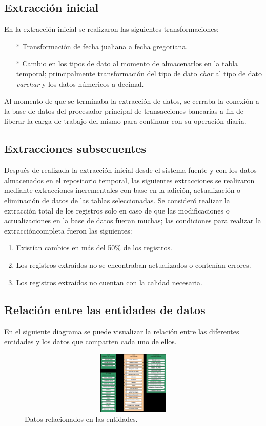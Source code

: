 \documentclass[a4paper,openright,12pt]{book}
\begin{document}
\subsection{Extracción inicial}
En la extracción inicial se realizaron las siguientes transformaciones:
\begin{itemize}
\item[*] Transformación de fecha jualiana a fecha gregoriana.
\item[*] Cambio en los tipos de dato al momento de almacenarlos en la tabla temporal; principalmente transformación del tipo de dato \textit{char} al tipo de dato \textit{varchar} y los datos númericos a decimal.
\end{itemize}
Al momento de que se terminaba la extracción de datos, se cerraba la conexión a la base de datos del procesador principal de transacciones bancarias a fin de liberar la carga de trabajo del mismo para continuar con su operación diaria. 
\subsection{Extracciones subsecuentes}
Después de realizada la extracción inicial desde el sistema fuente y con los datos almacenados en el repositorio temporal, las siguientes extracciones se realizaron mediante extracciones incrementales con base en la adición, actualización o eliminación de datos de las tablas seleccionadas. Se consideró realizar la extracción total de los registros solo en caso de que las modificaciones o actualizaciones en la base de datos fueran muchas; las condiciones para realizar la extraccióncompleta fueron las siguientes:
\begin{enumerate}
\item Existían cambios en más del 50\% de los registros.
\item Los registros extraídos no se encontraban actualizados o contenían errores.
\item Los registros extraídos no cuentan con la calidad necesaria.
\end{enumerate}
\subsection{Relación entre las entidades de datos}
En el siguiente diagrama se puede visualizar la relación entre las diferentes entidades y los datos que comparten cada uno de ellos.
\begin{figure}[htb]
  \begin{center}
    \includegraphics[width=12cm, height=3cm, scale=0.5]{Relacion_entidades.jpg}
        \caption{Datos relacionados en las entidades.}
    \label{fig:arquitectura}
  \end{center}
\end{figure}
\end{document}
